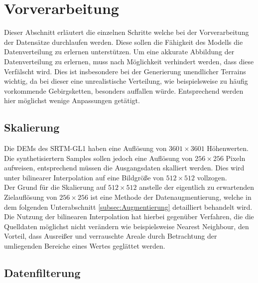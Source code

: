 \section{Vorverarbeitung}

Dieser Abschnitt erläutert die einzelnen Schritte welche bei der Vorverarbeitung der Datensätze durchlaufen werden. Diese sollen die Fähigkeit des Modells die Datenverteilung zu erlernen unterstützen. Um eine akkurate Abbildung der Datenverteilung zu erlernen, muss nach Möglichkeit verhindert werden, dass diese Verfälscht wird. Dies ist insbesondere bei der Generierung unendlicher Terrains wichtig, da bei dieser eine unrealistische Verteilung, wie beispielsweise zu häufig vorkommende Gebirgsketten, besonders auffallen würde. Entsprechend werden hier möglichst wenige Anpassungen getätigt.

\subsection{Skalierung}

Die \ac{DEM}s des SRTM-GL1 haben eine Auflösung von $3601\times3601$ Höhenwerten. Die synthetisiertern Samples sollen jedoch eine Auflösung von $256\times256$ Pixeln aufweisen, entsprechend müssen die Ausgangsdaten skalliert werden. Dies wird unter bilinearer Interpolation auf eine Bildgröße von $512\times512$ vollzogen. \\ 
Der Grund für die Skalierung auf $512\times512$ anstelle der eigentlich zu erwartenden Zielauflösung von $256\times256$ ist eine Methode der Datenaugmentierung, welche in dem folgenden Unterabschnitt \ref{subsec:Augmentierung} detailliert behandelt wird. \\
Die Nutzung der bilinearen Interpolation hat hierbei gegenüber Verfahren, die die Quelldaten möglichst nicht verändern wie beispielsweise Nearest Neighbour, den Vorteil, dass Ausreißer und verrauschte Areale durch Betrachtung der umliegenden Bereiche eines Wertes geglättet werden. 

\subsection{Datenfilterung}

